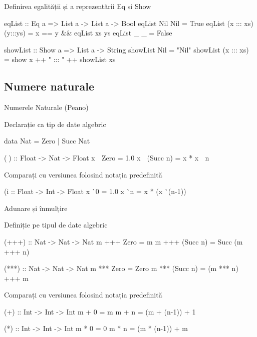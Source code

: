 \documentclass[xcolor=pdftex,romanian,colorlinks]{beamer}
\begin{document}
\begin{frame}[fragile]{Definirea egalității și a reprezentării}
{Eq și Show}
\begin{asciihs}
  eqList :: Eq a => List a -> List a -> Bool
  eqList Nil Nil  = True
  eqList (x ::: xs)  (y:::ys) = x == y && eqList xs ys
  eqList _          _            = False

  showList :: Show a => List a -> String
  showList Nil = "Nil"
  showList (x ::: xs) = show x ++ " ::: " ++ showList xs 
\end{asciihs}
\end{frame}



\subsection{Numere naturale}


\begin{frame}[fragile]{Numerele Naturale (Peano)}
\begin{block}{Declarație ca tip de date algebric}
\begin{asciihs}
   data     Nat   =      Zero
                  |      Succ Nat

   (^^^) :: Float -> Nat -> Float
   x ^^^ Zero      = 1.0
   x ^^^ (Succ n) = x * x ^^^ n
\end{asciihs}
\end{block}
\begin{block}{Comparați cu versiunea folosind notația predefinită}
\begin{asciihs}
   (^^) :: Float -> Int -> Float
   x ^^ 0 = 1.0
   x ^^ n = x * (x ^^ (n-1))
\end{asciihs}
\end{block}
\end{frame}

\begin{frame}[fragile]{Adunare și înmulțire}
\begin{block}{Definiție pe tipul de date algebric}
\vspace{-2ex}
\begin{asciihs}
   (+++) :: Nat -> Nat -> Nat
   m +++ Zero     = m
   m +++ (Succ n) = Succ (m +++ n)

   (***) :: Nat -> Nat -> Nat
   m *** Zero     = Zero
   m *** (Succ n) = (m *** n) +++ m
\end{asciihs}
\end{block}
\begin{block}{Comparați cu versiunea folosind notația predefinită}
\vspace{-2ex}
\begin{asciihs}
   (+) :: Int -> Int -> Int
   m + 0 = m
   m + n = (m + (n-1)) + 1

   (*) :: Int -> Int -> Int
   m * 0 = 0
   m * n = (m * (n-1)) + m
\end{asciihs}
\end{block}
\end{frame}
\end{document}
